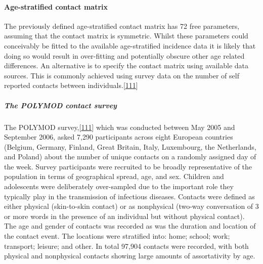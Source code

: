 \documentclass[11pt,twoside]{bristolthesis}
\begin{document}
  \hypertarget{contact-matrix}{%
  \paragraph{Age-stratified contact matrix}\label{contact-matrix}}
  
  The previously defined age-stratified contact matrix has 72 free parameters, assuming that the contact matrix is symmetric. Whilst these parameters could conceivably be fitted to the available age-stratified incidence data it is likely that doing so would result in over-fitting and potentially obscure other age related differences. An alternative is to specify the contact matrix using available data sources. This is commonly achieved using survey data on the number of self reported contacts between individuals.{[}\protect\hyperlink{ref-Mossong2008}{111}{]}
  
  \hypertarget{the-polymod-contact-survey}{%
  \subparagraph{The POLYMOD contact survey}\label{the-polymod-contact-survey}}
  
  The POLYMOD survey,{[}\protect\hyperlink{ref-Mossong2008}{111}{]} which was conducted between May 2005 and September 2006, asked 7,290 participants across eight European countries (Belgium, Germany, Finland, Great Britain, Italy, Luxembourg, the Netherlands, and Poland) about the number of unique contacts on a randomly assigned day of the week. Survey participants were recruited to be broadly representative of the population in terms of geographical spread, age, and sex. Children and adolescents were deliberately over-sampled due to the important role they typically play in the transmission of infectious diseases. Contacts were defined as either physical (skin-to-skin contact) or as nonphysical (two-way conversation of 3 or more words in the presence of an individual but without physical contact). The age and gender of contacts was recorded as was the duration and location of the contact event. The locations were stratified into: home; school; work; transport; leisure; and other. In total 97,904 contacts were recorded, with both physical and nonphysical contacts showing large amounts of assortativity by age.
  
\end{document}
